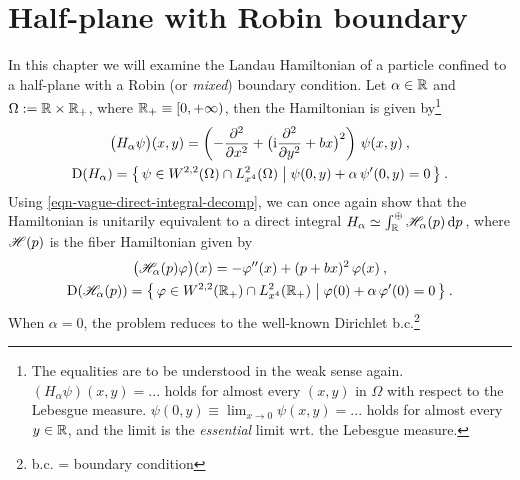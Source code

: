 \chapter{Half-plane with Robin boundary} \label{chapter-robin}
In this chapter we will examine the Landau Hamiltonian of a particle confined to a half-plane with a Robin (or \textit{mixed}) boundary condition. Let $\alpha \in \mathbb{R}$ and $\Omega := \mathbb{R} \times \mathbb{R}_+$, where $\mathbb{R}_+ \equiv [0, +\infty)$, then the Hamiltonian is given by\footnote{
    The equalities are to be understood in the weak sense again. $(H_\alpha \psi)(x, y) = ...$ holds for almost every $(x,y)$ in $\Omega$ with respect to the Lebesgue measure. $\psi(0,y) \equiv \lim_{x \to 0} \psi(x,y) = ...$ holds for almost every $y\in\mathbb{R}$, and the limit is the \textit{essential} limit wrt. the Lebesgue measure.
}
\begin{equation}
    \begin{gathered}
        \big( H_\alpha \psi \big)(x,y)
        = \left(
            -\frac{\partial ^2}{\partial x^2} +
            \big( \mathrm{i} \frac{\partial ^2}{\partial y^2} + bx \big)^2
        \right) \, \psi(x,y) \: ,
        \\
        \mathrm{D}(H_\alpha)
        = \big\{ \,
            \psi \in W^{2,2}(\Omega) \cap L^2_{x^4}(\Omega)
            \; \big| \;
            \psi(0,y) + \alpha \, \psi'(0,y) = 0
        \, \big\} \: .
    \end{gathered}
\end{equation}
Using \eqref{eqn-vague-direct-integral-decomp}, we can once again show that the Hamiltonian is unitarily equivalent to a direct integral $H_\alpha \simeq \int^\oplus_{\mathbb{R}} \mathscr{H}_\alpha(p) \, \mathrm{d}p \,$, where $\mathscr{H}(p)$ is the fiber Hamiltonian given by
\begin{equation}
    \begin{gathered}
        \big( \mathscr{H}_\alpha(p) \varphi \big)(x)
        = -\varphi''(x) + (p + bx)^2 \, \varphi(x) \: ,
        \\
        \mathrm{D}( \mathscr{H}_\alpha(p) )
        = \big\{ \,
            \varphi \in W^{2,2}(\mathbb{R}_+) \cap L^2_{x^4}(\mathbb{R}_+)
            \; \big| \;
            \varphi(0) + \alpha \, \varphi'(0) = 0
        \, \big\} \: .
    \end{gathered}
\end{equation}
When $\alpha=0$, the problem reduces to the well-known Dirichlet b.c.\footnote{b.c. = boundary condition}

